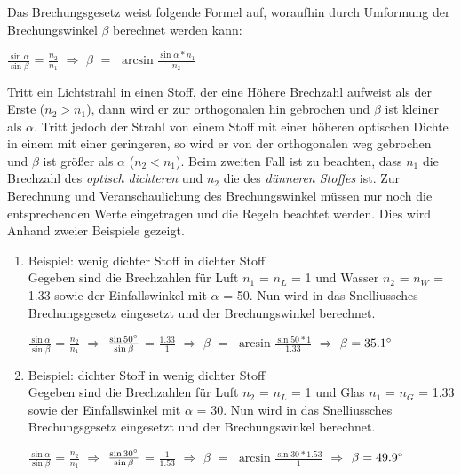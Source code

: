 Das Brechungsgesetz weist folgende Formel auf, woraufhin durch Umformung der Brechungswinkel $\beta$ berechnet werden kann: 
\begin{center}
$\frac{\sin\alpha}{\sin\beta}$ = $\frac{n_2}{n_1}$ $\Rightarrow$ $\beta$ $=$  $\arcsin\frac{\sin\alpha * n_1}{n_2}$\cite{brechungsgesetz1998}
\end{center}
Tritt ein Lichtstrahl in einen Stoff, der eine Höhere Brechzahl aufweist als der Erste ($n_2 > n_1$), dann wird er zur orthogonalen hin gebrochen und $\beta$ ist kleiner als $\alpha$. Tritt jedoch der Strahl von einem Stoff mit einer höheren optischen Dichte in einem mit einer geringeren, so wird er von der orthogonalen weg gebrochen und $\beta$ ist größer als $\alpha$ ($n_2 < n_1$). Beim zweiten Fall ist zu beachten, dass $n_1$ die Brechzahl des \textit{optisch dichteren} und $n_2$ die des \textit{dünneren Stoffes} ist. \cite{bernhardgrotz} Zur Berechnung und Veranschaulichung des Brechungswinkel müssen nur noch die entsprechenden Werte eingetragen und die Regeln beachtet werden. Dies wird Anhand zweier Beispiele gezeigt.

\begin{enumerate}
\item Beispiel: wenig dichter Stoff in dichter Stoff\\
Gegeben sind die Brechzahlen für Luft $n_1$ = $n_L$ = 1 und Wasser $n_2$ = $n_W$ = 1.33 sowie der Einfallswinkel mit $\alpha$ = 50\degree.
Nun wird in das Snelliussches Brechungsgesetz eingesetzt und der Brechungswinkel berechnet.
\begin{center}
$\frac{\sin\alpha}{\sin\beta}$ = $\frac{n_2}{n_1}$ $\Rightarrow$ $\frac{\sin 50\degree}{\sin\beta}$ = $\frac{1.33}{1}$ $\Rightarrow$ $\beta$ $=$  $\arcsin\frac{\sin 50 * 1}{1.33}$ $\Rightarrow$ $\beta = 35.1\degree$
\end{center}

\item Beispiel: dichter Stoff in wenig dichter Stoff\\
Gegeben sind die Brechzahlen für Luft $n_2$ = $n_L$ = 1 und Glas $n_1$ = $n_G$ = 1.33 sowie der Einfallswinkel mit $\alpha$ = 30\degree.
Nun wird in das Snelliussches Brechungsgesetz eingesetzt und der Brechungswinkel berechnet.
\begin{center}
$\frac{\sin\alpha}{\sin\beta}$ = $\frac{n_2}{n_1}$ $\Rightarrow$ $\frac{\sin 30\degree}{\sin\beta}$ = $\frac{1}{1.53}$ $\Rightarrow$ $\beta$ $=$  $\arcsin\frac{\sin 30 * 1.53}{1}$ $\Rightarrow$ $\beta = 49.9\degree$
\end{center}
\end{enumerate}

\newpage